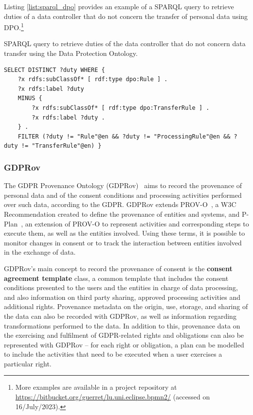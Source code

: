 Listing \ref{list:sparql_dpo} provides an example of a SPARQL query to retrieve duties of a data controller that do not concern the transfer of personal data using DPO.\footnote{More examples are available in a project repository at \url{https://bitbucket.org/guerret/lu.uni.eclipse.bpmn2/} (accessed on 16/July/2023).}

\begin{listing}[ht]
\caption[SPARQL query with DPO.]{SPARQL query to retrieve duties of the data controller that do not concern data transfer using the Data Protection Ontology.}
\label{list:sparql_dpo}
\begin{verbatim}
SELECT DISTINCT ?duty WHERE {
    ?x rdfs:subClassOf* [ rdf:type dpo:Rule ] .
	?x rdfs:label ?duty
	MINUS {
		?x rdfs:subClassOf* [ rdf:type dpo:TransferRule ] .
		?x rdfs:label ?duty .
	} .
	FILTER (?duty != "Rule"@en && ?duty != "ProcessingRule"@en && ?duty != "TransferRule"@en) }
\end{verbatim}
\end{listing}

\subsubsection{GDPRov}
\label{sec:gdprov}

The GDPR Provenance Ontology (GDPRov)~\citep{pandit_modelling_2017} aims to record the provenance of personal data and of the consent conditions and processing activities performed over such data, according to the GDPR.
GDPRov extends PROV-O~\citep{lebo_prov-o_2013}, a W3C Recommendation created to define the provenance of entities and systems, and P-Plan~\citep{garijo_augmenting_2012}, an extension of PROV-O to represent activities and corresponding steps to execute them, as well as the entities involved.
Using these terms, it is possible to monitor changes in consent or to track the interaction between entities involved in the exchange of data.

GDPRov's main concept to record the provenance of consent is the \textbf{consent agreement template} class, a common template that includes the consent conditions presented to the users and the entities in charge of data processing, and also information on third party sharing, approved processing activities and additional rights.
Provenance metadata on the origin, use, storage, and sharing of the data can also be recorded with GDPRov, as well as information regarding transformations performed to the data.
In addition to this, provenance data on the exercising and fulfilment of GDPR-related rights and obligations can also be represented with GDPRov -- for each right or obligation, a plan can be modelled to include the activities that need to be executed when a user exercises a particular right.

